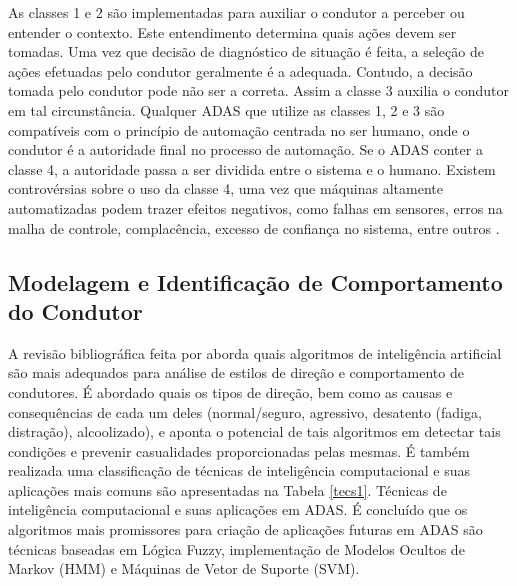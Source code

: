 As classes 1 e 2 são implementadas para auxiliar o condutor a perceber ou entender o contexto. Este entendimento determina quais ações devem ser tomadas. Uma vez que decisão de diagnóstico de situação é feita, a seleção de ações efetuadas pelo condutor geralmente é a adequada. Contudo, a decisão tomada pelo condutor pode não ser a correta. Assim a classe 3 auxilia o condutor em tal circunstância. Qualquer ADAS que utilize as classes 1, 2 e 3 são compatíveis com o princípio de automação centrada no ser humano, onde o condutor é a autoridade final no processo de automação. Se o ADAS conter a classe 4, a autoridade passa a ser dividida entre o sistema e o humano. Existem controvérsias sobre o uso da classe 4, uma vez que máquinas altamente automatizadas podem trazer efeitos negativos, como falhas em sensores, erros na malha de controle, complacência, excesso de confiança no sistema, entre outros \cite{Inagaki2012}.



\subsection{Modelagem e Identificação de Comportamento do Condutor}

A revisão bibliográfica feita por  aborda quais algoritmos de inteligência artificial são mais adequados para análise de estilos de direção e comportamento de condutores. É abordado quais os tipos de direção, bem como as causas e consequências de cada um deles (normal/seguro, agressivo, desatento (fadiga, distração), alcoolizado), e aponta o potencial de tais algoritmos em detectar tais condições e prevenir casualidades proporcionadas pelas mesmas. É também realizada uma classificação de técnicas de inteligência computacional e suas aplicações mais comuns são apresentadas na Tabela \ref{tecs1}. Técnicas de inteligência computacional e suas aplicações em ADAS. É concluído que os algoritmos mais promissores para criação de aplicações futuras em ADAS são técnicas baseadas em Lógica Fuzzy, implementação de Modelos Ocultos de Markov (HMM) e Máquinas de Vetor de Suporte (SVM).

